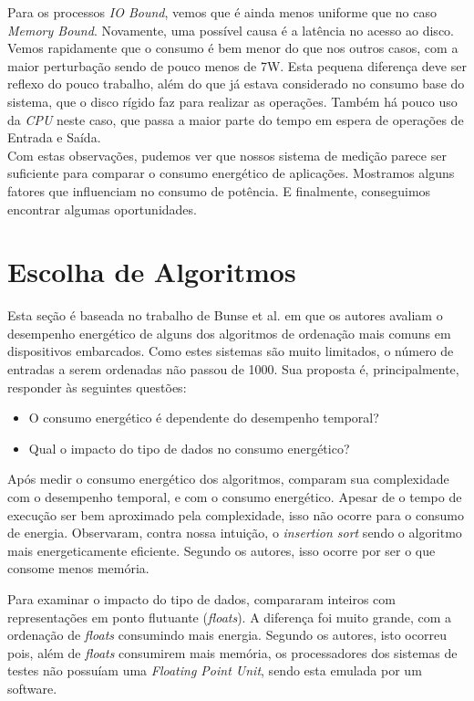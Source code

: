 Para os processos \emph{IO Bound}, vemos que é ainda menos uniforme que no caso \emph{Memory Bound}. Novamente, uma possível causa é a latência no acesso ao disco. Vemos rapidamente que o consumo é bem menor do que nos outros casos, com a maior perturbação sendo de pouco menos de 7W. Esta pequena diferença deve ser reflexo do pouco trabalho, além do que já estava considerado no consumo base do sistema, que o disco rígido faz para realizar as operações. Também há pouco uso da \emph{CPU} neste caso, que passa a maior parte do tempo em espera de operações de Entrada e Saída. \\


Com estas observações, pudemos ver que nossos sistema de medição parece ser suficiente para comparar o consumo energético de aplicações. Mostramos alguns fatores que influenciam no consumo de potência. E finalmente, conseguimos encontrar algumas oportunidades.

\section{Escolha de Algoritmos}
Esta seção é baseada no trabalho de Bunse et al. \cite{bunse2009exploring} em que os autores avaliam o desempenho energético de alguns dos algoritmos de ordenação mais comuns em dispositivos embarcados. Como estes sistemas são muito limitados, o número de entradas a serem ordenadas não passou de 1000. Sua proposta é, principalmente, responder às seguintes questões:

\begin{itemize}
  \item O consumo energético é dependente do desempenho temporal?
  \item Qual o impacto do tipo de dados no consumo energético?
\end{itemize}

Após medir o consumo energético dos algoritmos, comparam sua complexidade com o desempenho temporal, e com o consumo energético. Apesar de o tempo de execução ser bem aproximado pela complexidade, isso não ocorre para o consumo de energia. Observaram, contra nossa intuição, o \emph{insertion sort} sendo o algoritmo mais energeticamente eficiente. Segundo os autores, isso ocorre por ser o que consome menos memória.

Para examinar o impacto do tipo de dados, compararam inteiros com representações em ponto flutuante (\emph{floats}). A diferença foi muito grande, com a ordenação de \emph{floats} consumindo mais energia. Segundo os autores, isto ocorreu pois, além de \emph{floats} consumirem mais memória, os processadores dos sistemas de testes não possuíam uma \emph{Floating Point Unit}, sendo esta emulada por um software. \\

